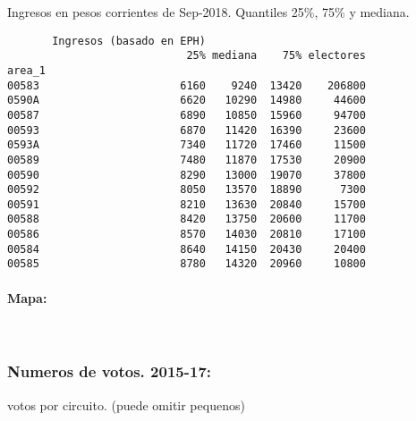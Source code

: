 \documentclass[11pt]{article}
\begin{document}
    
    Ingresos en pesos corrientes de Sep-2018. Quantiles 25\%, 75\% y
mediana.

    
    
    \begin{verbatim}
       Ingresos (basado en EPH)                         
                            25% mediana    75% electores
area_1                                                  
00583                      6160    9240  13420    206800
0590A                      6620   10290  14980     44600
00587                      6890   10850  15960     94700
00593                      6870   11420  16390     23600
0593A                      7340   11720  17460     11500
00589                      7480   11870  17530     20900
00590                      8290   13000  19070     37800
00592                      8050   13570  18890      7300
00591                      8210   13630  20840     15700
00588                      8420   13750  20600     11700
00586                      8570   14030  20810     17100
00584                      8640   14150  20430     20400
00585                      8780   14320  20960     10800
    \end{verbatim}

    
    \hypertarget{mapa}{%
\paragraph{Mapa:}\label{mapa}}

    
    \begin{center}
    \end{center}
    { \hspace*{\fill} \\}
    
    \hypertarget{numeros-de-votos.-2015-17}{%
\subsubsection{Numeros de votos.
2015-17:}\label{numeros-de-votos.-2015-17}}

    
    votos por circuito. (puede omitir pequenos)

    
    
\end{document}
